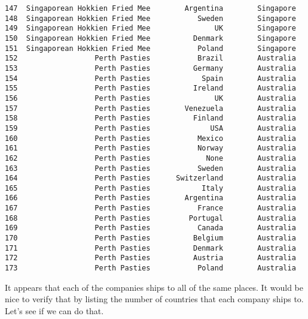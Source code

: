\documentclass[11pt]{article}
\begin{document}
\begin{tcolorbox}[breakable, size=fbox, boxrule=.5pt, pad at break*=1mm, opacityfill=0]
\begin{Verbatim}[commandchars=\\\{\}]
147  Singaporean Hokkien Fried Mee        Argentina        Singapore
148  Singaporean Hokkien Fried Mee           Sweden        Singapore
149  Singaporean Hokkien Fried Mee               UK        Singapore
150  Singaporean Hokkien Fried Mee          Denmark        Singapore
151  Singaporean Hokkien Fried Mee           Poland        Singapore
152                  Perth Pasties           Brazil        Australia
153                  Perth Pasties          Germany        Australia
154                  Perth Pasties            Spain        Australia
155                  Perth Pasties          Ireland        Australia
156                  Perth Pasties               UK        Australia
157                  Perth Pasties        Venezuela        Australia
158                  Perth Pasties          Finland        Australia
159                  Perth Pasties              USA        Australia
160                  Perth Pasties           Mexico        Australia
161                  Perth Pasties           Norway        Australia
162                  Perth Pasties             None        Australia
163                  Perth Pasties           Sweden        Australia
164                  Perth Pasties      Switzerland        Australia
165                  Perth Pasties            Italy        Australia
166                  Perth Pasties        Argentina        Australia
167                  Perth Pasties           France        Australia
168                  Perth Pasties         Portugal        Australia
169                  Perth Pasties           Canada        Australia
170                  Perth Pasties          Belgium        Australia
171                  Perth Pasties          Denmark        Australia
172                  Perth Pasties          Austria        Australia
173                  Perth Pasties           Poland        Australia
\end{Verbatim}
\end{tcolorbox}
        
    It appears that each of the companies ships to all of the same places.
It would be nice to verify that by listing the number of countries that
each company ships to. Let's see if we can do that.
\end{document}
